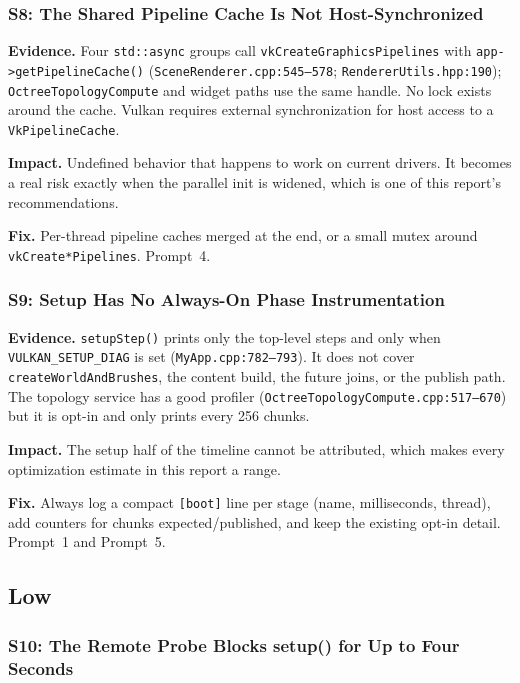 \documentclass[11pt,a4paper]{article}
\begin{document}
\subsubsection*{S8: The Shared Pipeline Cache Is Not Host-Synchronized}

\textbf{Evidence.} Four \texttt{std::async} groups call
\texttt{vkCreateGraphicsPipelines} with \texttt{app->getPipelineCache()}
(\texttt{SceneRenderer.cpp:545--578}; \texttt{RendererUtils.hpp:190});
\texttt{OctreeTopologyCompute} and widget paths use the same handle. No lock
exists around the cache. Vulkan requires external synchronization for host
access to a \texttt{VkPipelineCache}.

\textbf{Impact.} Undefined behavior that happens to work on current drivers.
It becomes a real risk exactly when the parallel init is widened, which is
one of this report's recommendations.

\textbf{Fix.} Per-thread pipeline caches merged at the end, or a small mutex
around \texttt{vkCreate*Pipelines}. Prompt~4.

\subsubsection*{S9: Setup Has No Always-On Phase Instrumentation}
\label{sec:instrument}

\textbf{Evidence.} \texttt{setupStep()} prints only the top-level steps and
only when \texttt{VULKAN\_SETUP\_DIAG} is set
(\texttt{MyApp.cpp:782--793}). It does not cover \texttt{createWorldAndBrushes},
the content build, the future joins, or the publish path. The topology
service has a good profiler (\texttt{OctreeTopologyCompute.cpp:517--670}) but
it is opt-in and only prints every 256 chunks.

\textbf{Impact.} The setup half of the timeline cannot be attributed, which
makes every optimization estimate in this report a range.

\textbf{Fix.} Always log a compact \texttt{[boot]} line per stage (name,
milliseconds, thread), add counters for chunks expected/published, and keep
the existing opt-in detail. Prompt~1 and Prompt~5.

\subsection{Low}

\subsubsection*{S10: The Remote Probe Blocks setup() for Up to Four Seconds}
\end{document}
